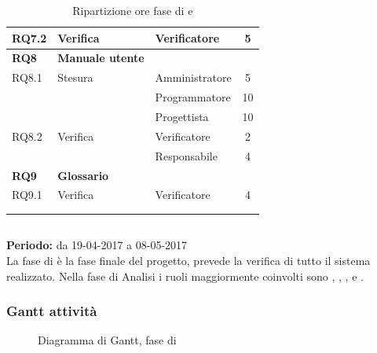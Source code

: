 \begin{longtable}{|l|l|l|c|}
	\hline
	{RQ7.2} & {Verifica} & Verificatore & 5 \\
	\hline
	\textbf{RQ8} & \textbf{Manuale utente} & &  \\
	\hline
	{RQ8.1} & {Stesura} & Amministratore  & 5\\
	& & Programmatore &  10\\
	& & Progettista &  10\\
	\hline
	{RQ8.2} & {Verifica} & Verificatore & 2 \\
	& & Responsabile & 4 \\
	\hline
	\textbf{RQ9} & \textbf{Glossario} & &  \\
	\hline
	{RQ9.1} & {Verifica} & Verificatore &  4 \\
	\hline
	\\
	\caption{Ripartizione ore fase di \PD e \Cod}
\end{longtable}
\egroup

\subsection{\VV}
\textbf{Periodo:} da 19-04-2017 a 08-05-2017 \\
La fase di \VV{} è la fase finale del progetto, prevede la verifica di tutto il sistema realizzato.
Nella fase di Analisi i ruoli maggiormente coinvolti sono \Programmatore, \Progettista, \Responsabile, \Amministratore{} e \Verificatore.
\subsubsection{Gantt attività}
\begin{figure}[H]
	\centering
	\caption{Diagramma di Gantt, fase di \VV}
\end{figure}

